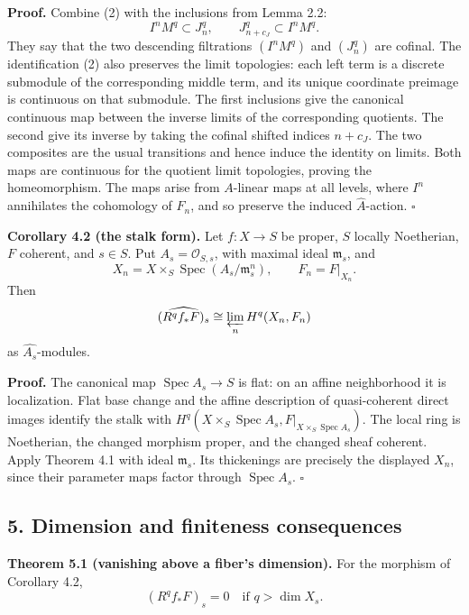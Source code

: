\documentclass[11pt]{article}
\begin{document}
\textbf{Proof.} Combine (2) with the inclusions from Lemma 2.2: \[
I^nM^q\subset J_n^q,\qquad J_{n+c_J}^q\subset I^nM^q.
\] They say that the two descending filtrations \((I^nM^q)\) and
\((J_n^q)\) are cofinal. The identification (2) also preserves the limit
topologies: each left term is a discrete submodule of the corresponding
middle term, and its unique coordinate preimage is continuous on that
submodule. The first inclusions give the canonical continuous map
between the inverse limits of the corresponding quotients. The second
give its inverse by taking the cofinal shifted indices \(n+c_J\). The
two composites are the usual transitions and hence induce the identity
on limits. Both maps are continuous for the quotient limit topologies,
proving the homeomorphism. The maps arise from \(A\)-linear maps at all
levels, where \(I^n\) annihilates the cohomology of \(F_n\), and so
preserve the induced \(\widehat A\)-action. \(\square\)

\textbf{Corollary 4.2 (the stalk form).} Let \(f:X\to S\) be proper,
\(S\) locally Noetherian, \(F\) coherent, and \(s\in S\). Put
\(A_s=\mathcal O_{S,s}\), with maximal ideal \(\mathfrak m_s\), and \[
X_n=X\times_S\operatorname{Spec}(A_s/\mathfrak m_s^n),\qquad F_n=F|_{X_n}.
\] Then \[
\widehat{(R^qf_*F)_s}\cong\varprojlim_n H^q(X_n,F_n)
\] as \(\widehat{A_s}\)-modules.

\textbf{Proof.} The canonical map \(\operatorname{Spec}A_s\to S\) is
flat: on an affine neighborhood it is localization. Flat base change and
the affine description of quasi-coherent direct images identify the
stalk with
\(H^q(X\times_S\operatorname{Spec}A_s,F|_{X\times_S\operatorname{Spec}A_s})\).
The local ring is Noetherian, the changed morphism proper, and the
changed sheaf coherent. Apply Theorem 4.1 with ideal \(\mathfrak m_s\).
Its thickenings are precisely the displayed \(X_n\), since their
parameter maps factor through \(\operatorname{Spec}A_s\). \(\square\)

\subsection{5. Dimension and finiteness
consequences}\label{dimension-and-finiteness-consequences}

\textbf{Theorem 5.1 (vanishing above a fiber's dimension).} For the
morphism of Corollary 4.2, \[
(R^qf_*F)_s=0\quad\text{if }q>\dim X_s.
\]
\end{document}
